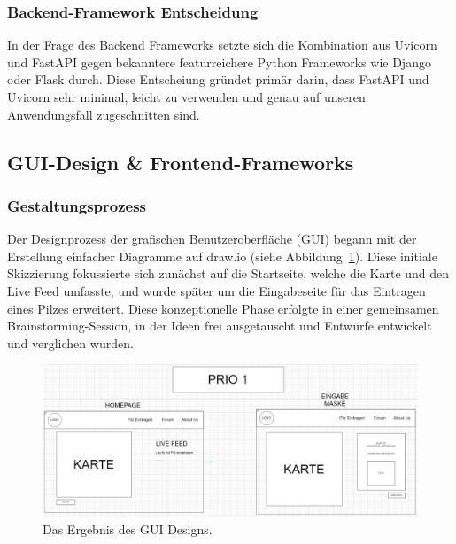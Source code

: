 \documentclass[../main.tex]{subfiles} %
\begin{document}
\subsubsection{Backend-Framework Entscheidung}

In der Frage des Backend Frameworks setzte sich die Kombination aus Uvicorn und FastAPI gegen bekanntere featurreichere Python Frameworks wie Django oder Flask durch.
Diese Entscheiung gründet primär darin, dass FastAPI und Uvicorn sehr minimal, leicht zu verwenden und genau auf unseren Anwendungsfall zugeschnitten sind.

\subsection{GUI-Design \& Frontend-Frameworks}

\subsubsection{Gestaltungsprozess}

Der Designprozess der grafischen Benutzeroberfläche (GUI) begann mit der Erstellung einfacher Diagramme auf draw.io
(siehe Abbildung~\ref{fig:GUI_Entwurf}). Diese initiale Skizzierung fokussierte sich zunächst auf die Startseite, welche
die Karte und den Live Feed umfasste, und wurde später um die Eingabeseite für das Eintragen eines Pilzes erweitert. Diese
konzeptionelle Phase erfolgte in einer gemeinsamen Brainstorming-Session, in der Ideen frei ausgetauscht und Entwürfe
entwickelt und verglichen wurden.

\begin{figure}[ht]
	\centering
	\includegraphics[width=\textwidth]{abbildungen/GuiEntwurfDrawio.jpg}
	\caption{Das Ergebnis des GUI Designs.}
	\label{fig:GUI_Entwurf}
\end{figure}
\end{document}
